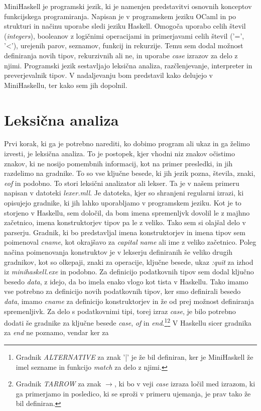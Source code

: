 \documentclass[12pt,a4paper,openany]{book}
\begin{document}
MiniHaskell je programski jezik, ki je namenjen predstavitvi osnovnih konceptov funkcijskega programiranja. Napisan je v programskem jeziku 
OCaml in po strukturi in načinu uporabe sledi jeziku Haskell. Omogoča uporabo celih števil (\textit{integers}), booleanov z logičnimi operacijami in primerjavami 
celih števil ('=', '<'), urejenih parov, seznamov, funkcij in rekurzije. Temu sem dodal možnost definiranja novih tipov, rekurzivnih ali ne, in 
uporabe \emph{case} izrazov za delo z njimi. Programski jezik sestavljajo leksična analiza, razčlenjevanje, interpreter in preverjevalnik tipov. V nadaljevanju bom predstavil kako 
delujejo v MiniHaskellu, ter kako sem jih dopolnil.

\section{Leksična analiza}
Prvi korak, ki ga je potrebno narediti, ko dobimo program ali ukaz in ga želimo izvesti, je leksična analiza. To je postopek, kjer vhodni niz znakov očistimo znakov, ki ne nosijo pomembnih informacij, kot 
na primer presledki, in jih razdelimo na gradnike. To so vse ključne besede, ki jih jezik pozna, števila, znaki, \emph{eof} in podobno. To stori leksični analizator ali lekser. 
Ta je v našem primeru napisan v datoteki \emph{lexer.mll}. Je datoteka, kjer so shranjeni regularni izrazi, ki opisujejo gradnike, ki jih lahko uporabljamo v programskem jeziku. 
Kot je to storjeno v Haskellu, sem določil, da bom imena spremenljvk dovolil le z majhno začetnico, imena konstruktorjev tipov pa le z veliko. Tako sem si olajšal delo v parserju. 
Gradnik, ki bo predstavljal imena konstruktorjev in imena tipov sem poimenoval \emph{cname}, kot okrajšavo za \textit{capital name} ali ime z veliko začetnico. Poleg načina poimenovanja 
konstruktov je v lekserju definiranih še veliko drugih gradnikov, kot so olkepaji, znaki za operacije, ključne besede, ukaz \emph{:quit} za izhod iz \emph{minihaskell.exe} 
in podobno. Za definicijo podatkovnih tipov sem dodal ključno besedo \emph{data}, z idejo, da bo imela enako vlogo kot tista v Haskellu. Tako imamo vse potrebno za 
definicijo novih podatkovnih tipov, ker smo definirali besedo \emph{data}, imamo \emph{cname} za definicijo konstruktorjev in že od prej možnost definiranja spremenljivk.
Za delo s podatkovnimi tipi, torej izraz \emph{case}, je bilo potrebno dodati še gradnike za ključne besede \emph{case}, \emph{of} in \emph{end}.\footnote{Gradnik \emph{ALTERNATIVE} 
za znak '|' je že bil definiran, ker je MiniHaskell že imel sezname in funkcijo \emph{match} za delo z njimi.}\footnote{Gradnik \emph{TARROW} za znak \emph{$\rightarrow$}, ki bo v veji \emph{case} 
izraza ločil med izrazom, ki ga primerjamo in posledico, ki se sproži v primeru ujemanja, je prav tako že bil definiran.} V Haskellu sicer gradnika za \emph{end} ne poznamo, vendar ker za 
\end{document}
